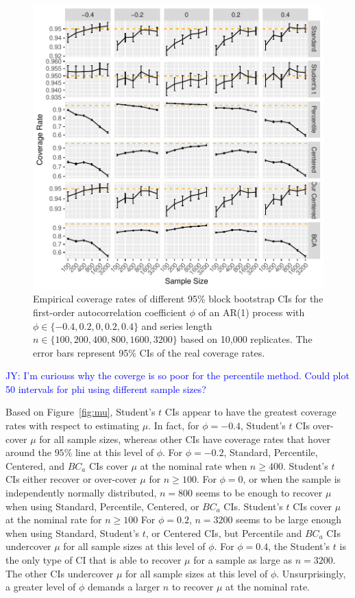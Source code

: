 \documentclass[12pt, letterpaper, titlepage]{article}
\newcommand{\jy}[1]{\textcolor{blue}{JY: #1}}
\begin{document}
\begin{figure}[tbp]
  \centering
  \includegraphics[width=\textwidth]{figures/plot_phi}
  \caption{Empirical coverage rates of different 95\% block bootstrap CIs for
    the first-order autocorrelation coefficient $\phi$ of an AR(1) process with
    $\phi \in \{-0.4, 0.2, 0, 0.2, 0.4\}$ and series length
    $n \in \{100, 200, 400, 800, 1600, 3200\}$ based on 10,000 replicates.
    The error bars represent 95\% CIs of the real coverage rates.}
  \label{fig:phi}
\end{figure}

\jy{I'm curiouss why the coverge is so poor for the percentile method. Could
  plot 50 intervals for phi using different sample sizes?}


Based on Figure~\ref{fig:mu}, 
Student's $t$ CIs appear to have the greatest coverage rates with respect 
to estimating $\mu$. In fact, for $\phi = -0.4$, Student's $t$ CIs over-cover $\mu$
for all sample sizes, whereas other CIs have coverage rates that
hover around the $95\%$ line at this level of $\phi$. For $\phi = -0.2$, 
Standard, Percentile, Centered, and $BC_a$ CIs cover $\mu$ at the nominal 
rate when $n \geq 400$. Student's $t$ CIs either recover or over-cover $\mu$
for $n \geq 100$. For $\phi = 0$, or when the 
sample is independently normally distributed, $n = 800$ seems to 
be enough to recover $\mu$ when using Standard, Percentile, Centered, or $BC_a$ 
CIs. Student's $t$ CIs cover $\mu$ at the nominal rate for $n \geq 100$
For $\phi = 0.2$, $n = 3200$ seems to be large enough when using
Standard, Student's $t$, or Centered CIs, but Percentile and $BC_a$ CIs undercover
$\mu$ for all sample sizes at this level of $\phi$.
For $\phi = 0.4$, the Student's $t$ is the only type of CI that is able to recover $\mu$
for a sample as large as $n = 3200$. The other CIs undercover $\mu$ for all sample 
sizes at this level of $\phi$. Unsurprisingly, a greater level of $\phi$ demands a 
larger $n$ to recover $\mu$ at the nominal rate.
\end{document}
